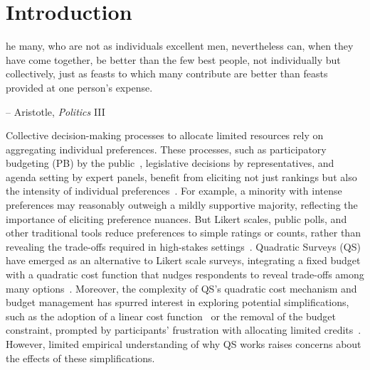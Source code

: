 \section{Introduction}

\begin{displayquote}
[T]he many, who are not as individuals excellent men, nevertheless can, when they have come together, be better than the few best people, not individually but collectively, just as feasts to which many contribute are better than feasts provided at one person's expense.

\begin{flushright}
-- Aristotle, \textit{Politics} III
\end{flushright}
\end{displayquote}

Collective decision-making processes to allocate limited resources rely on aggregating individual preferences. These processes, such as participatory budgeting (PB) by the public~\cite{desousasantosParticipatoryBudgetingPorto1998}, legislative decisions by representatives, and agenda setting by expert panels, benefit from eliciting not just rankings but also the intensity of individual preferences~\cite{weylShuWeiPluralityFuture2024, krosnick1999survey}. For example, a minority with intense preferences may reasonably outweigh a mildly supportive majority, reflecting the importance of eliciting preference nuances. But Likert scales, public polls, and other traditional tools reduce preferences to simple ratings or counts, rather than revealing the trade-offs required in high-stakes settings~\cite{quarfoot2017quadratic,posner2017quadratic, krosnick1999survey}. Quadratic Surveys (QS) have emerged as an alternative to Likert scale surveys, integrating a fixed budget with a quadratic cost function that nudges respondents to reveal trade-offs among many options~\cite{chengCanShowWhat2021, quarfoot2017quadratic, cavaille2024cares}. Moreover, the complexity of QS's quadratic cost mechanism and budget management has spurred interest in exploring potential simplifications, such as the adoption of a linear cost function~\cite{cavaille2024cares, chengOrganizeThenVote2025} or the removal of the budget constraint, prompted by participants' frustration with allocating limited credits~\cite{chengCanShowWhat2021}. However, limited empirical understanding of why QS works raises concerns about the effects of these simplifications.

